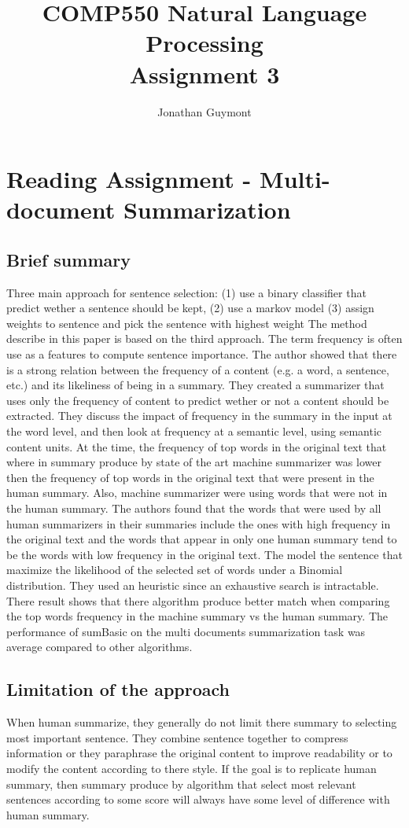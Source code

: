 \documentclass[10pt]{article}
\title{COMP550 Natural Language Processing\\Assignment 3}
\author{Jonathan Guymont}
\begin{document}
\maketitle

\section{Reading Assignment - Multi-document Summarization}
\subsection{Brief summary}
Three main approach for sentence selection: (1) use a binary classifier that predict wether a sentence should be kept, (2) use a markov model
(3) assign weights to sentence and pick the sentence with highest weight
The method describe in this paper is based on the third approach. The term frequency is often use as a features to compute sentence importance. The author showed that there is a strong relation between the frequency of a content (e.g. a word, a sentence, etc.) and its likeliness of being in a summary. They created a summarizer that uses only the frequency of content to predict wether or not a content should be extracted. They discuss the impact of frequency in the summary in the input at the word level, and then look at frequency at a semantic level, using semantic content units. At the time, the frequency of top words in the original text that where in summary produce by state of the art machine summarizer was lower then the frequency of top words in the original text that were present in the human summary. Also, machine summarizer were using words that were not in the human summary. The authors found that the words that were used by all human summarizers  in their summaries include the ones with high frequency in the original text and the words that appear in only one human summary tend to be the words with low frequency in the original text. The model the sentence that maximize the likelihood of the selected set of words under a Binomial distribution. They used an heuristic since an exhaustive search is intractable. There result shows that there algorithm produce better match when comparing the top words frequency in the machine summary vs the human summary. 
The performance of sumBasic on the multi documents summarization task was average compared to other algorithms.

\subsection{Limitation of the approach}
When human summarize, they generally do not limit there summary to selecting most important sentence. They combine sentence together to compress information or they paraphrase the original content to improve readability or to modify the content according to there style. If the goal is to replicate human summary, then summary produce by algorithm that select most relevant sentences according to some score will always have some level of difference with human summary.
\end{document}
